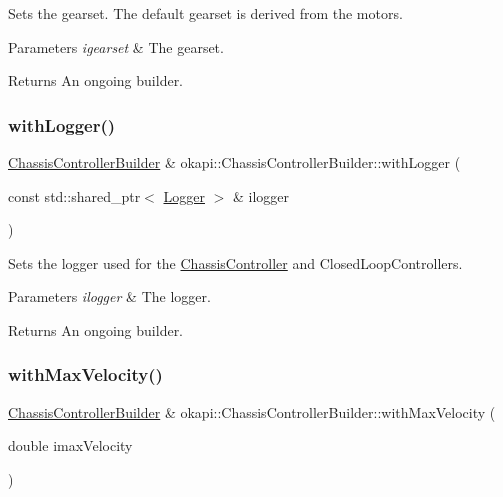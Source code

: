 Sets the gearset. The default gearset is derived from the motor\textquotesingle{}s.


\begin{DoxyParams}{Parameters}
{\em igearset} & The gearset. \\
\hline
\end{DoxyParams}
\begin{DoxyReturn}{Returns}
An ongoing builder. 
\end{DoxyReturn}
\mbox{\label{classokapi_1_1ChassisControllerBuilder_ac2ba4b3f5a3b08e611ea21e0d9406250}} 
\subsubsection{\texorpdfstring{withLogger()}{withLogger()}}
{\footnotesize\ttfamily \mbox{\hyperlink{classokapi_1_1ChassisControllerBuilder}{Chassis\+Controller\+Builder}} \& okapi\+::\+Chassis\+Controller\+Builder\+::with\+Logger (\begin{DoxyParamCaption}\item[{const std\+::shared\+\_\+ptr$<$ \mbox{\hyperlink{classokapi_1_1Logger}{Logger}} $>$ \&}]{ilogger }\end{DoxyParamCaption})}

Sets the logger used for the \mbox{\hyperlink{classokapi_1_1ChassisController}{Chassis\+Controller}} and Closed\+Loop\+Controllers.


\begin{DoxyParams}{Parameters}
{\em ilogger} & The logger. \\
\hline
\end{DoxyParams}
\begin{DoxyReturn}{Returns}
An ongoing builder. 
\end{DoxyReturn}
\mbox{\label{classokapi_1_1ChassisControllerBuilder_aee0580c75bf16663f065aad88fdc795d}} 
\subsubsection{\texorpdfstring{withMaxVelocity()}{withMaxVelocity()}}
{\footnotesize\ttfamily \mbox{\hyperlink{classokapi_1_1ChassisControllerBuilder}{Chassis\+Controller\+Builder}} \& okapi\+::\+Chassis\+Controller\+Builder\+::with\+Max\+Velocity (\begin{DoxyParamCaption}\item[{double}]{imax\+Velocity }\end{DoxyParamCaption})}

